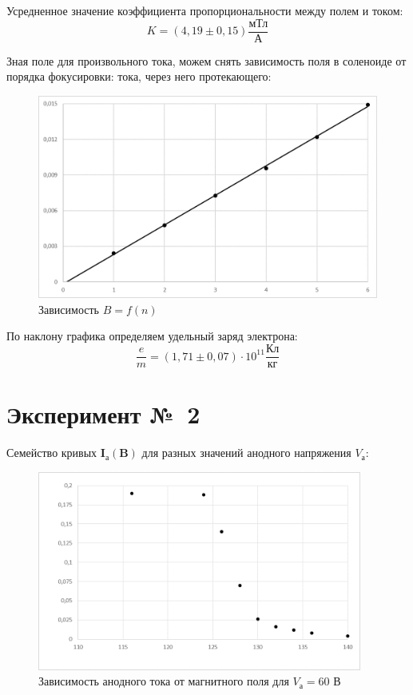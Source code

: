 \documentclass[a4paper, 12pt]{article}
\begin{document}
Усредненное значение коэффициента пропорциональности между полем и током:
$$K = (4,19 \pm 0,15) \frac{\text{мТл}}{\text{А}}$$

Зная поле для произвольного тока, можем снять зависимость поля в соленоиде от порядка фокусировки:
тока, через него протекающего:
\begin {figure}[H]
\begin{center}
\includegraphics[width=\textwidth]{graph2_gk}
\caption{Зависимость $B=f(n)$}
\end{center}
\end {figure}



По наклону графика определяем удельный заряд электрона:
$$\frac{e}{m} = (1,71\pm 0,07) \cdot 10^{11} \frac{\text{Кл}}{\text{кг}}$$



\pagebreak
\section*{Эксперимент №~2}
Семейство кривых $\mathbf{I_\text{а}(B)}$ для разных значений анодного напряжения $V_\text{а}$:


\begin {figure}[H]
\begin{center}
\includegraphics[width=0.95\textwidth]{graph3_gk}
\caption{Зависимость анодного тока от магнитного поля для $V_\text{а}=60$ В}
\end{center}
\end {figure}
\end{document}
